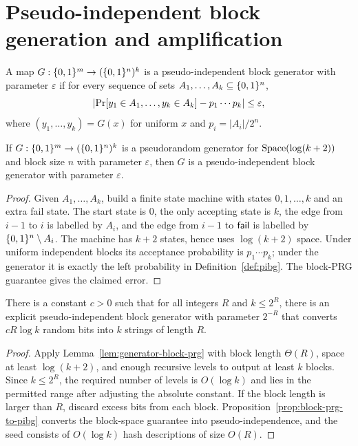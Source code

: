 \chapter{Pseudo-independent block generation and amplification}

\begin{definition}
  \label{def:pibg}
  A map $G:\{0,1\}^m\to(\{0,1\}^n)^k$ is a pseudo-independent block generator with
  parameter $\varepsilon$ if for every sequence of sets
  $A_1,\ldots,A_k\subseteq\{0,1\}^n$,
  \[
    \left|\operatorname{Pr}[y_1\in A_1,\ldots,y_k\in A_k]-p_1\cdots p_k\right|\le\varepsilon,
  \]
  where $(y_1,\ldots,y_k)=G(x)$ for uniform $x$ and
  $p_i=|A_i|/2^n$.
\end{definition}

\begin{proposition}
  \label{prop:block-prg-to-pibg}
  If $G:\{0,1\}^m\to(\{0,1\}^n)^k$ is a pseudorandom generator for
  $\operatorname{Space}(\log(k+2))$ and block size $n$ with parameter $\varepsilon$, then
  $G$ is a pseudo-independent block generator with parameter $\varepsilon$.
\end{proposition}
\begin{proof}
  Given $A_1,\ldots,A_k$, build a finite state machine with states
  $0,1,\ldots,k$ and an extra fail state. The start state is $0$, the only
  accepting state is $k$, the edge from $i-1$ to $i$ is labelled by $A_i$, and
  the edge from $i-1$ to $\mathsf{fail}$ is labelled by $\{0,1\}^n\setminus A_i$.
  The machine has $k+2$ states, hence uses $\log(k+2)$ space. Under uniform
  independent blocks its acceptance probability is $p_1\cdots p_k$; under the
  generator it is exactly the left probability in Definition~\ref{def:pibg}.
  The block-PRG guarantee gives the claimed error.
\end{proof}

\begin{theorem}
  \label{thm:pibg-main}
  There is a constant $c>0$ such that for all integers $R$ and $k\le 2^R$,
  there is an explicit pseudo-independent block generator with parameter
  $2^{-R}$ that converts $cR\log k$ random bits into $k$ strings of length $R$.
\end{theorem}
\begin{proof}
  Apply Lemma~\ref{lem:generator-block-prg} with block length $\Theta(R)$,
  space at least $\log(k+2)$, and enough recursive levels to output at least
  $k$ blocks. Since $k\le2^R$, the required number of levels is $O(\log k)$
  and lies in the permitted range after adjusting the absolute constant. If
  the block length is larger than $R$, discard excess bits from each block.
  Proposition~\ref{prop:block-prg-to-pibg} converts the block-space guarantee
  into pseudo-independence, and the seed consists of $O(\log k)$ hash
  descriptions of size $O(R)$.
\end{proof}

